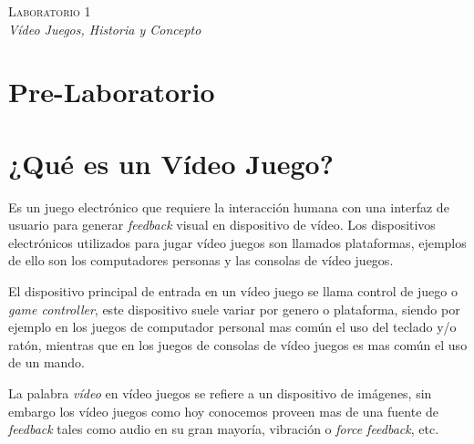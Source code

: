 \begin{center}
\textsc{\Large Laboratorio 1}~\\
\emph{\large Vídeo Juegos, Historia y Concepto}
\end{center}

\section{Pre-Laboratorio}

\section{¿Qué es un Vídeo Juego?}
Es un juego electrónico que requiere la interacción humana con una interfaz de usuario para generar \emph{feedback} visual en dispositivo de vídeo. Los dispositivos electrónicos utilizados para jugar vídeo juegos son llamados plataformas, ejemplos de ello son los computadores personas y las consolas de vídeo juegos.

El dispositivo principal de entrada en un vídeo juego se llama control de juego o \emph{game controller}, este dispositivo suele variar por genero o plataforma, siendo por ejemplo en los juegos de computador personal mas común el uso del teclado y/o ratón, mientras que en los juegos de consolas de vídeo juegos es mas común el uso de un mando.

La palabra \emph{vídeo} en vídeo juegos se refiere a un dispositivo de imágenes, sin embargo los vídeo juegos como hoy conocemos proveen mas de una fuente de \emph{feedback} tales como audio en su gran mayoría, vibración o \emph{force feedback}, etc.

